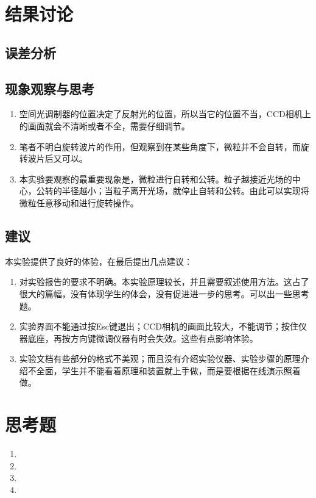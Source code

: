 \documentclass[UTF8,12pt,a4paper]{article}
\begin{document}
\section{结果讨论}
\subsection{误差分析}

\subsection{现象观察与思考}
\begin{enumerate}
	\item 空间光调制器的位置决定了反射光的位置，所以当它的位置不当，CCD相机上的画面就会不清晰或者不全，需要仔细调节。
	\item 笔者不明白旋转波片的作用，但观察到在某些角度下，微粒并不会自转，而旋转波片后又可以。
	\item 本实验要观察的最重要现象是，微粒进行自转和公转。粒子越接近光场的中心，公转的半径越小；当粒子离开光场，就停止自转和公转。由此可以实现将微粒任意移动和进行旋转操作。
\end{enumerate}

\subsection{建议}
本实验提供了良好的体验，在最后提出几点建议：
\begin{enumerate}
	\item 对实验报告的要求不明确。本实验原理较长，并且需要叙述使用方法。这占了很大的篇幅，没有体现学生的体会，没有促进进一步的思考。可以出一些思考题。
	\item 实验界面不能通过按Esc键退出；CCD相机的画面比较大，不能调节；按住仪器底座，再按方向键微调仪器有时会失效。这些有点影响体验。
	\item 实验文档有些部分的格式不美观；而且没有介绍实验仪器、实验步骤的原理介绍不全面，学生并不能看着原理和装置就上手做，而是要根据在线演示照着做。
\end{enumerate}


\section{思考题}
\begin{enumerate}
	\item 
	\item 
	\item 
	\item 
\end{enumerate}
\end{document}
